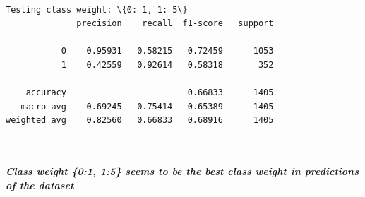 \documentclass[11pt]{article}
\makeatletter
\newcommand{\boxspacing}{\kern\kvtcb@left@rule\kern\kvtcb@boxsep}
\newcommand{\prompt}[4]{
        {\ttfamily\llap{{\color{#2}[#3]:\hspace{3pt}#4}}\vspace{-\baselineskip}}
    }
\makeatother
\begin{document}
    \begin{center}
    \end{center}
    { \hspace*{\fill} \\}
    
    \begin{Verbatim}[commandchars=\\\{\}]
Testing class weight: \{0: 1, 1: 5\}
              precision    recall  f1-score   support

           0    0.95931   0.58215   0.72459      1053
           1    0.42559   0.92614   0.58318       352

    accuracy                        0.66833      1405
   macro avg    0.69245   0.75414   0.65389      1405
weighted avg    0.82560   0.66833   0.68916      1405

    \end{Verbatim}

    \begin{center}
    \end{center}
    { \hspace*{\fill} \\}
    
    \subparagraph{Class weight \{0:1, 1:5\} seems to be the best class
weight in predictions of the
dataset}\label{class-weight-01-15-seems-to-be-the-best-class-weight-in-predictions-of-the-dataset}

    \begin{tcolorbox}[breakable, size=fbox, boxrule=1pt, pad at break*=1mm,colback=cellbackground, colframe=cellborder]
\prompt{In}{incolor}{ }{\boxspacing}
\begin{Verbatim}[commandchars=\\\{\}]

\end{Verbatim}
\end{tcolorbox}
\end{document}
